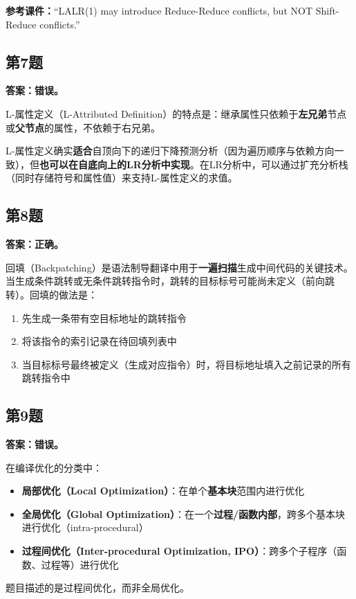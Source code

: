 \documentclass[12pt,a4paper,fontset=fandol]{ctexart}
\begin{document}
\textbf{参考课件：}``LALR(1) may introduce Reduce-Reduce conflicts, but NOT Shift-Reduce conflicts.''

\subsection*{第7题}
\textbf{答案：错误。}

L-属性定义（L-Attributed Definition）的特点是：继承属性只依赖于\textbf{左兄弟}节点或\textbf{父节点}的属性，不依赖于右兄弟。

L-属性定义确实\textbf{适合}自顶向下的递归下降预测分析（因为遍历顺序与依赖方向一致），但\textbf{也可以在自底向上的LR分析中实现}。在LR分析中，可以通过扩充分析栈（同时存储符号和属性值）来支持L-属性定义的求值。

\subsection*{第8题}
\textbf{答案：正确。}

回填（Backpatching）是语法制导翻译中用于\textbf{一遍扫描}生成中间代码的关键技术。当生成条件跳转或无条件跳转指令时，跳转的目标标号可能尚未定义（前向跳转）。回填的做法是：
\begin{enumerate}[label=(\arabic*)]
    \item 先生成一条带有空目标地址的跳转指令
    \item 将该指令的索引记录在待回填列表中
    \item 当目标标号最终被定义（生成对应指令）时，将目标地址填入之前记录的所有跳转指令中
\end{enumerate}

\subsection*{第9题}
\textbf{答案：错误。}

在编译优化的分类中：
\begin{itemize}
    \item \textbf{局部优化（Local Optimization）}：在单个\textbf{基本块}范围内进行优化
    \item \textbf{全局优化（Global Optimization）}：在一个\textbf{过程/函数内部}，跨多个基本块进行优化（intra-procedural）
    \item \textbf{过程间优化（Inter-procedural Optimization, IPO）}：跨多个子程序（函数、过程等）进行优化
\end{itemize}

题目描述的是过程间优化，而非全局优化。
\end{document}
